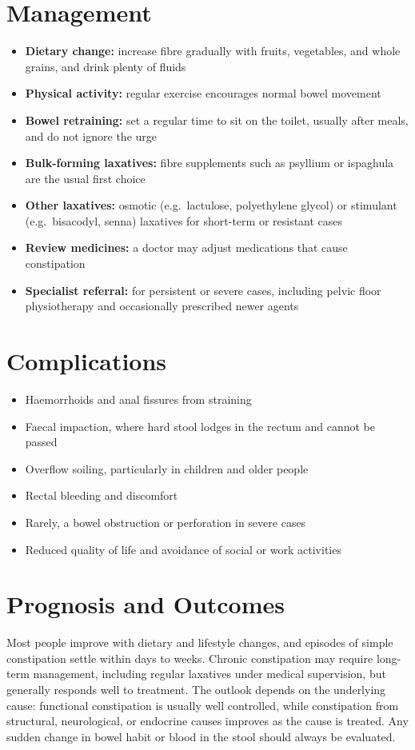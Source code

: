\section*{Management}
\begin{itemize}
    \item \textbf{Dietary change:} increase fibre gradually with fruits, vegetables, and whole grains, and drink plenty of fluids
    \item \textbf{Physical activity:} regular exercise encourages normal bowel movement
    \item \textbf{Bowel retraining:} set a regular time to sit on the toilet, usually after meals, and do not ignore the urge
    \item \textbf{Bulk-forming laxatives:} fibre supplements such as psyllium or ispaghula are the usual first choice
    \item \textbf{Other laxatives:} osmotic (e.g.\ lactulose, polyethylene glycol) or stimulant (e.g.\ bisacodyl, senna) laxatives for short-term or resistant cases
    \item \textbf{Review medicines:} a doctor may adjust medications that cause constipation
    \item \textbf{Specialist referral:} for persistent or severe cases, including pelvic floor physiotherapy and occasionally prescribed newer agents
\end{itemize}

\section*{Complications}
\begin{itemize}
    \item Haemorrhoids and anal fissures from straining
    \item Faecal impaction, where hard stool lodges in the rectum and cannot be passed
    \item Overflow soiling, particularly in children and older people
    \item Rectal bleeding and discomfort
    \item Rarely, a bowel obstruction or perforation in severe cases
    \item Reduced quality of life and avoidance of social or work activities
\end{itemize}

\section*{Prognosis and Outcomes}
Most people improve with dietary and lifestyle changes, and episodes of simple constipation settle within days to weeks. Chronic constipation may require long-term management, including regular laxatives under medical supervision, but generally responds well to treatment. The outlook depends on the underlying cause: functional constipation is usually well controlled, while constipation from structural, neurological, or endocrine causes improves as the cause is treated. Any sudden change in bowel habit or blood in the stool should always be evaluated.

